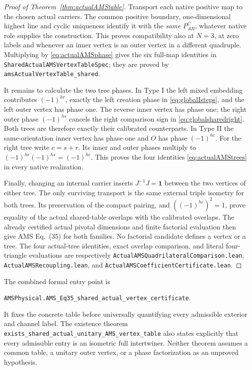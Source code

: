 \documentclass[10pt,a4paper]{article}
\newcommand{\id}{\mathbf 1}
\newcommand{\lean}[1]{{\small\nolinkurl{#1}}}
\newenvironment{revision}{\begingroup}{\endgroup}
\begin{document}
\begin{revision}
\begin{proof}[Proof of Theorem~\ref{thm:actualAMStable}]
Transport each native positive map to the chosen actual carriers.
The common positive boundary, one-dimensional highest line and cyclic
uniqueness identify it with the \emph{same} $P_{AB}^{C}$, whatever
native role supplies the construction. This proves compatibility
also at $N=3$, at zero labels and whenever an inner vertex is an
outer vertex in a different quadruple. Multiplying by
\eqref{eq:actualAMSphase} gives the six full-map identities in
\lean{SharedActualAMSVertexTableSpec}; they are proved by
\lean{amsActualVertexTable_shared}.

It remains to calculate the two tree phases. In Type I the left
mixed embedding contributes $(-1)^{hr}$, exactly the left creation
phase in \eqref{eq:globalIsteps}, and the left outer vertex has phase
one. The reverse inner vertex has phase one; the right outer phase
$(-1)^{hs}$ cancels the right comparison sign in
\eqref{eq:globalsharedright}. Both trees are therefore exactly their
calibrated counterparts. In Type II the same-orientation inner
vertex has phase one and $O$ has phase $(-1)^{hc}$. For the right tree
write $c=s+r$. Its inner and outer phases multiply to
$(-1)^{hr}(-1)^{hs}=(-1)^{hc}$. This proves the four identities
\eqref{eq:actualAMStrees} in every native realization.

Finally, changing an internal carrier inserts $J^{-1}J=\id$
between the two vertices of either tree. The only surviving
transport is the same external triple isometry for both trees.
Its preservation of the compact pairing, and
$((-1)^{hc})^2=1$, prove equality of the actual shared-table overlaps
with the calibrated overlaps. The already certified actual pivotal
dimensions and finite factorial evaluation then give AMS Eq.~(35)
for both families. No factorial candidate defines a vertex or a tree.
The four actual-tree identities, exact overlap comparison, and literal
four-triangle evaluations are respectively
\lean{ActualAMSQuadrilateralComparison.lean},
\lean{ActualAMSRecoupling.lean}, and
\lean{ActualAMSCoefficientCertificate.lean}.
\end{proof}

The combined formal entry point is
\begin{center}
\lean{AMSPhysical.AMS_Eq35_shared_actual_vertex_certificate}.
\end{center}
It fixes the concrete table before universally quantifying every
admissible exterior and channel label. The existence theorem
\lean{exists_shared_actual_unitary_AMS_vertex_table} also states
explicitly that every admissible entry is an isometric full
intertwiner. Neither theorem assumes a common table, a unitary outer
vertex, or a phase factorization as an unproved hypothesis.


\end{revision}
\end{document}
